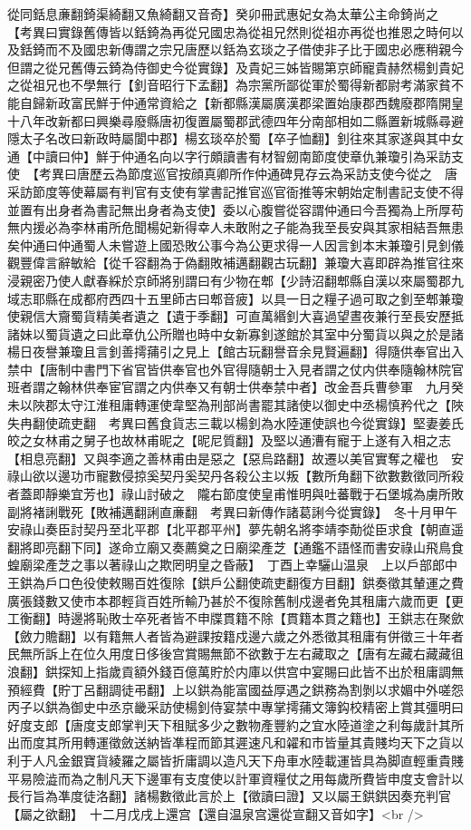 從同銛息亷翻錡渠綺翻又魚綺翻又音奇】癸卯冊武惠妃女為太華公主命錡尚之　【考異曰實錄舊傳皆以銛錡為再從兄國忠為從祖兄然則從祖亦再從也推恩之時何以及銛錡而不及國忠新傳謂之宗兄唐歷以銛為玄琰之子借使非子比于國忠必應稍親今但謂之從兄舊傳云錡為侍御史今從實錄】及貴妃三姊皆賜第京師寵貴赫然楊釗貴妃之從祖兄也不學無行【釗音昭行下孟翻】為宗黨所鄙從軍於蜀得新都尉考滿家貧不能自歸新政富民鮮于仲通常資給之【新都縣漢屬廣漢郡梁置始康郡西魏廢郡隋開皇十八年改新都曰興樂尋廢縣唐初復置屬蜀郡武德四年分南部相如二縣置新城縣尋避隱太子名改曰新政時屬閬中郡】楊玄琰卒於蜀【卒子恤翻】釗往來其家遂與其中女通【中讀曰仲】鮮于仲通名向以字行頗讀書有材智劒南節度使章仇兼瓊引為采訪支使　【考異曰唐歷云為節度巡官按顔真卿所作仲通碑見存云為采訪支使今從之　唐采訪節度等使幕屬有判官有支使有掌書記推官巡官衙推等宋朝始定制書記支使不得並置有出身者為書記無出身者為支使】委以心腹嘗從容謂仲通曰今吾獨為上所厚苟無内援必為李林甫所危聞楊妃新得幸人未敢附之子能為我至長安與其家相結吾無患矣仲通曰仲通蜀人未嘗遊上國恐敗公事今為公更求得一人因言釗本末兼瓊引見釗儀觀豐偉言辭敏給【從千容翻為于偽翻敗補邁翻觀古玩翻】兼瓊大喜即辟為推官往來浸親密乃使人獻春綵於京師將别謂曰有少物在郫【少詩沼翻郫縣自漢以來屬蜀郡九域志耶縣在成都府西四十五里師古曰郫音疲】以具一日之糧子過可取之釗至郫兼瓊使親信大齎蜀貨精美者遺之【遺于季翻】可直萬緡釗大喜過望晝夜兼行至長安歷抵諸妹以蜀貨遺之曰此章仇公所贈也時中女新寡釗遂館於其室中分蜀貨以與之於是諸楊日夜譽兼瓊且言釗善摴蒱引之見上【館古玩翻譽音余見賢遍翻】得隨供奉官出入禁中【唐制中書門下省官皆供奉官也外官得隨朝士入見者謂之仗内供奉隨翰林院官班者謂之翰林供奉宦官謂之内供奉又有朝士供奉禁中者】改金吾兵曹參軍　九月癸未以陜郡太守江淮租庸轉運使韋堅為刑部尚書罷其諸使以御史中丞楊慎矜代之【陜失冉翻使疏吏翻　考異曰舊食貨志三載以楊釗為水陸運使誤也今從實錄】堅妻姜氏皎之女林甫之舅子也故林甫昵之【昵尼質翻】及堅以通漕有寵于上遂有入相之志【相息亮翻】又與李適之善林甫由是惡之【惡烏路翻】故遷以美官實奪之權也　安祿山欲以邊功市寵數侵掠奚契丹奚契丹各殺公主以叛【數所角翻下欲數數徵同所殺者蓋即靜樂宜芳也】祿山討破之　隴右節度使皇甫惟明與吐蕃戰于石堡城為虜所敗副將褚誗戰死【敗補邁翻誗直亷翻　考異曰新傳作諸葛誗今從實錄】　冬十月甲午安祿山奏臣討契丹至北平郡【北平郡平州】夢先朝名將李靖李勣從臣求食【朝直遥翻將即亮翻下同】遂命立廟又奏薦奠之日廟梁產芝【通鑑不語怪而書安祿山飛鳥食蝗廟梁產芝之事以著祿山之欺罔明皇之昏蔽】　丁酉上幸驪山温泉　上以戶部郎中王鉷為戶口色役使敕賜百姓復除【鉷戶公翻使疏吏翻復方目翻】鉷奏徵其輦運之費廣張錢數又使市本郡輕貨百姓所輸乃甚於不復除舊制戍邊者免其租庸六歲而更【更工衡翻】時邊將恥敗士卒死者皆不申牒貫籍不除【貫籍本貫之籍也】王鉷志在聚歛【斂力贍翻】以有籍無人者皆為避課按籍戍邊六歲之外悉徵其租庸有併徵三十年者民無所訴上在位久用度日侈後宫賞賜無節不欲數于左右藏取之【唐有左藏右藏藏徂浪翻】鉷探知上指歲貢額外錢百億萬貯於内庫以供宫中宴賜曰此皆不出於租庸調無預經費【貯丁呂翻調徒弔翻】上以鉷為能富國益厚遇之鉷務為割剝以求媚中外嗟怨丙子以鉷為御史中丞京畿采訪使楊釗侍宴禁中專掌摴蒱文簿鈎校精密上賞其彊明曰好度支郎【唐度支郎掌判天下租賦多少之數物產豐約之宜水陸道塗之利每歲計其所出而度其所用轉運徵斂送納皆凖程而節其遲速凡和糴和市皆量其貴賤均天下之貨以利于人凡金銀寶貨綾羅之屬皆折庸調以造凡天下舟車水陸載運皆具為脚直輕重貴賤平易險澁而為之制凡天下邊軍有支度使以計軍資糧仗之用每歲所費皆申度支會計以長行旨為凖度徒洛翻】諸楊數徵此言於上【徵讀曰證】又以屬王鉷鉷因奏充判官【屬之欲翻】　十二月戊戌上還宫【還自温泉宫還從宣翻又音如字】<br />

